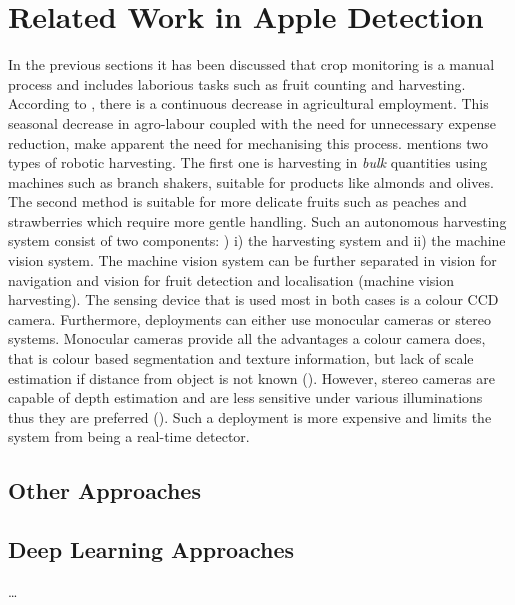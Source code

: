 \chapter{Related Work in Apple Detection} \label{Chapter:AppleDetection}

In the previous sections it has been discussed that crop monitoring is a manual process and includes laborious tasks such as fruit counting and harvesting. According to \cite{agro_employment}, there is a continuous decrease in agricultural employment. This seasonal decrease in agro-labour coupled with the need for unnecessary expense reduction, make apparent the need for mechanising this process. \cite{baeten2008autonomous} mentions two types of robotic harvesting. The first one is harvesting in \textit{bulk} quantities using machines such as branch shakers, suitable for products like almonds and olives. The second method is suitable for more delicate fruits such as peaches and strawberries which require more gentle handling. Such an autonomous harvesting system consist of two components: \cite{widyartono2019harvesting}) i) the harvesting system and ii) the machine vision system. The machine vision system can be further separated in vision for navigation and vision for fruit detection and localisation (machine vision harvesting). The sensing device that is used most in both cases is a colour CCD camera. Furthermore, deployments can either use monocular cameras or stereo systems. Monocular cameras provide all the advantages a colour camera does, that is colour based segmentation and texture information, but lack of scale estimation if distance from object is not known (\cite{gongal2015sensors}). However, stereo cameras are capable of depth estimation and are less sensitive under various illuminations thus they are preferred (\cite{wang2016localisation}). Such a deployment is more expensive and limits the system from being a real-time detector.



\section{Other Approaches}
\section{Deep Learning Approaches}
\dots